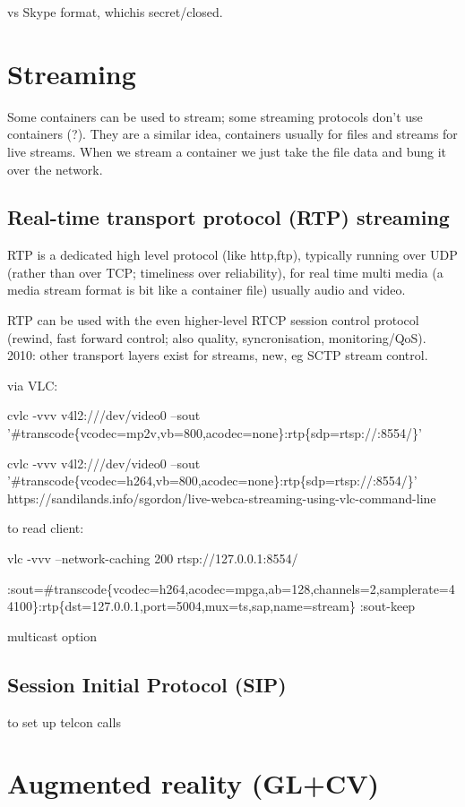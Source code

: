 \documentclass[oneside,english]{scrbook}
\begin{document}
vs Skype format, whichis secret/closed.


\chapter{Streaming}
Some containers can be used to stream; some streaming protocols don't use containers (?). They are a similar idea, containers usually for files and streams for live streams. When we stream a container we just take the file data and bung it over the network.

\section{Real-time transport protocol (RTP) streaming}

RTP is a dedicated high level protocol (like http,ftp), typically running over UDP (rather than over TCP; timeliness over reliability), for real time multi media (a media stream format is bit like a container file) usually audio and video.

RTP can be used with the even higher-level RTCP session control protocol (rewind, fast forward control; also quality, syncronisation, monitoring/QoS).   2010: other transport layers exist for streams, new, eg SCTP stream control.

via VLC: 

cvlc -vvv v4l2:///dev/video0 --sout '\#transcode\{vcodec=mp2v,vb=800,acodec=none\}:rtp\{sdp=rtsp://:8554/\}' 

cvlc -vvv v4l2:///dev/video0 --sout '\#transcode\{vcodec=h264,vb=800,acodec=none\}:rtp\{sdp=rtsp://:8554/\}'
https://sandilands.info/sgordon/live-webca-streaming-using-vlc-command-line

to read client: 

vlc -vvv --network-caching 200 rtsp://127.0.0.1:8554/

:sout=\#transcode\{vcodec=h264,acodec=mpga,ab=128,channels=2,samplerate=44100\}:rtp\{dst=127.0.0.1,port=5004,mux=ts,sap,name=stream\}
:sout-keep

multicast option


\section{Session Initial Protocol (SIP)}

to set up telcon calls


\chapter{Augmented reality (GL+CV)}
\end{document}
